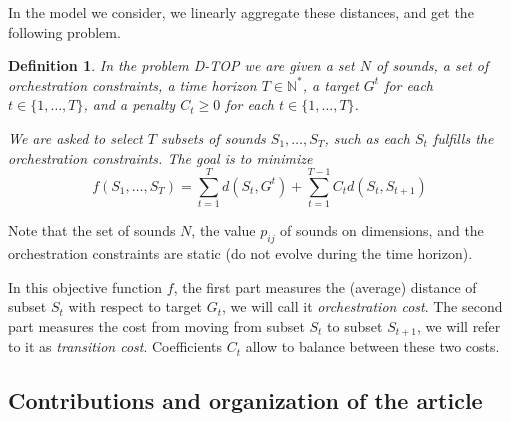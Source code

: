 \documentclass[a4paper]{book}
\newtheorem{definition}{Definition}
\newcommand{\dyn}{{\sc D-TOP }}
\begin{document}
In the model we consider, we linearly aggregate these distances, and get the following problem.


\begin{definition}
In the problem \dyn we are given a set $N$ of sounds, a set of orchestration constraints, a time horizon $T \in \mathbb{N}^*$, a target $G^t$ for each $t\in \{1,\dots,T\}$, and a penalty $C_t\geq 0$ for each $t\in \{1,\dots,T\}$.

We are asked to select $T$ subsets of sounds $S_{1},\dots,S_T$, such as each $S_t$ fulfills the orchestration constraints. The goal is to minimize 
$$f(S_1,\dots,S_T)=\sum_{t=1}^T d(S_t,G^t)+\sum_{t=1}^{T-1} C_t d(S_t,S_{t+1})$$

\end{definition}
Note that the set of sounds $N$, the value $p_{ij}$ of sounds on dimensions, and the orchestration constraints are static (do not evolve during the time horizon). 

In this objective function $f$, the first part measures the (average) distance of subset $S_t$ with respect to target $G_t$, we will call it {\it orchestration cost}. The second part measures  the cost from moving from subset $S_t$ to subset $S_{t+1}$, we will refer to it as {\it transition cost}. Coefficients $C_t$ allow to balance between these two costs.

\subsection{Contributions and organization of the article}
\end{document}
